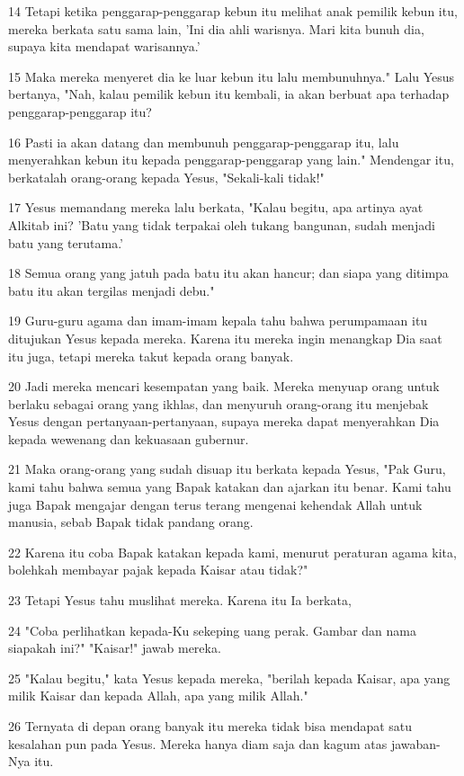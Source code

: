 \par 14 Tetapi ketika penggarap-penggarap kebun itu melihat anak pemilik kebun itu, mereka berkata satu sama lain, 'Ini dia ahli warisnya. Mari kita bunuh dia, supaya kita mendapat warisannya.'
\par 15 Maka mereka menyeret dia ke luar kebun itu lalu membunuhnya." Lalu Yesus bertanya, "Nah, kalau pemilik kebun itu kembali, ia akan berbuat apa terhadap penggarap-penggarap itu?
\par 16 Pasti ia akan datang dan membunuh penggarap-penggarap itu, lalu menyerahkan kebun itu kepada penggarap-penggarap yang lain." Mendengar itu, berkatalah orang-orang kepada Yesus, "Sekali-kali tidak!"
\par 17 Yesus memandang mereka lalu berkata, "Kalau begitu, apa artinya ayat Alkitab ini? 'Batu yang tidak terpakai oleh tukang bangunan, sudah menjadi batu yang terutama.'
\par 18 Semua orang yang jatuh pada batu itu akan hancur; dan siapa yang ditimpa batu itu akan tergilas menjadi debu."
\par 19 Guru-guru agama dan imam-imam kepala tahu bahwa perumpamaan itu ditujukan Yesus kepada mereka. Karena itu mereka ingin menangkap Dia saat itu juga, tetapi mereka takut kepada orang banyak.
\par 20 Jadi mereka mencari kesempatan yang baik. Mereka menyuap orang untuk berlaku sebagai orang yang ikhlas, dan menyuruh orang-orang itu menjebak Yesus dengan pertanyaan-pertanyaan, supaya mereka dapat menyerahkan Dia kepada wewenang dan kekuasaan gubernur.
\par 21 Maka orang-orang yang sudah disuap itu berkata kepada Yesus, "Pak Guru, kami tahu bahwa semua yang Bapak katakan dan ajarkan itu benar. Kami tahu juga Bapak mengajar dengan terus terang mengenai kehendak Allah untuk manusia, sebab Bapak tidak pandang orang.
\par 22 Karena itu coba Bapak katakan kepada kami, menurut peraturan agama kita, bolehkah membayar pajak kepada Kaisar atau tidak?"
\par 23 Tetapi Yesus tahu muslihat mereka. Karena itu Ia berkata,
\par 24 "Coba perlihatkan kepada-Ku sekeping uang perak. Gambar dan nama siapakah ini?" "Kaisar!" jawab mereka.
\par 25 "Kalau begitu," kata Yesus kepada mereka, "berilah kepada Kaisar, apa yang milik Kaisar dan kepada Allah, apa yang milik Allah."
\par 26 Ternyata di depan orang banyak itu mereka tidak bisa mendapat satu kesalahan pun pada Yesus. Mereka hanya diam saja dan kagum atas jawaban-Nya itu.
